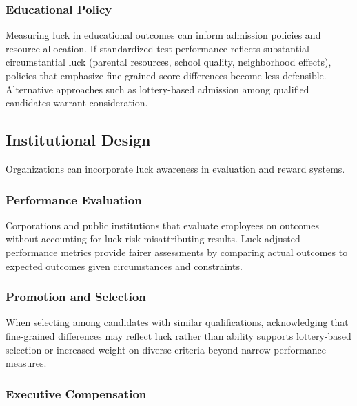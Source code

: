   \subsubsection{Educational Policy}

  Measuring luck in educational outcomes can inform admission policies and
  resource allocation. If standardized test performance reflects
  substantial circumstantial luck (parental resources, school quality, neighborhood
  effects), policies that emphasize fine-grained score differences become
  less defensible. Alternative approaches such as lottery-based
  admission among qualified candidates warrant consideration.

  \subsection{Institutional Design}

  Organizations can incorporate luck awareness in evaluation and reward systems.

  \subsubsection{Performance Evaluation}

  Corporations and public institutions that evaluate employees on
  outcomes without accounting for luck risk misattributing results. Luck-adjusted
  performance metrics provide fairer assessments by comparing actual outcomes
  to expected outcomes given circumstances and constraints.

  \subsubsection{Promotion and Selection}

  When selecting among candidates with similar qualifications, acknowledging
  that fine-grained differences may reflect luck rather than ability supports
  lottery-based selection or increased weight on diverse criteria beyond
  narrow performance measures.

  \subsubsection{Executive Compensation}


